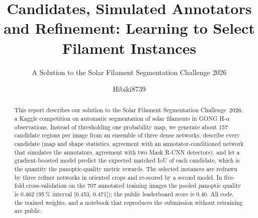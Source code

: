 \documentclass[sigconf]{acmart}
\begin{document}
\title{Candidates, Simulated Annotators and Refinement: Learning to Select Filament Instances}  %
\subtitle{A Solution to the Solar Filament Segmentation Challenge 2026} %


\author{Hibiki8739}
%

\begin{abstract}
    This report describes our solution to the Solar Filament Segmentation Challenge~2026, a Kaggle competition on automatic segmentation of solar filaments in GONG H-$\alpha$ observations. Instead of thresholding one probability map, we generate about 157 candidate regions per image from an ensemble of three dense networks, describe every candidate (map and shape statistics, agreement with an annotator-conditioned network that simulates the annotators, agreement with two Mask R-CNN detectors), and let a gradient-boosted model predict the expected matched IoU of each candidate, which is the quantity the panoptic-quality metric rewards. The selected instances are redrawn by three refiner networks in oriented crops and re-scored by a second model. In five-fold cross-validation on the 707 annotated training images the pooled panoptic quality is 0.462 (95\,\% interval [0.453, 0.471]); the public leaderboard score is 0.40. All code, the trained weights, and a notebook that reproduces the submission without retraining are public.
\end{abstract}

\maketitle

\ifguideStyle
{}
\par\medskip
\fi

\end{document}
